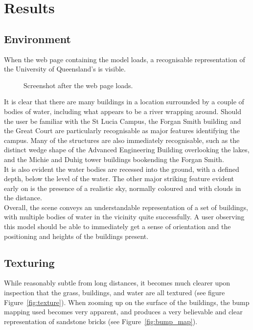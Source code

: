 \section{Results} %
\label{sec:results}
    \subsection{Environment} %
    \label{sub:environment}
        When the web page containing the model loads, a recognisable representation of the University of Queensland's is visible.

        \begin{figure}[H]
            \centering
            \caption{
                Screenshot after the web page loads.
            }
            \label{fig:start}
        \end{figure}

        It is clear that there are many buildings in a location surrounded by
        a couple of bodies of water, including what appears to be a river wrapping around.
        Should the user be familiar with the St Lucia Campus, the Forgan Smith building and the Great Court are particularly recognisable as major features identifying the campus.
        Many of the structures are also immediately recognisable, such as the distinct wedge shape of the Advanced Engineering Building overlooking the lakes, and the Michie and Duhig tower buildings bookending the Forgan Smith.\\

        It is also evident the water bodies are recessed into the ground, with a defined depth, below the level of the water.
        The other major striking feature evident early on is the presence of a realistic sky, normally coloured and with clouds in the distance.\\

        Overall, the scene conveys an understandable representation of a set of buildings, with multiple bodies of water in the vicinity quite successfully.
        A user observing this model should be able to immediately get a sense of orientation and the positioning and heights of the buildings present.

    \subsection{Texturing} %
    \label{sub:texturing}
        While reasonably subtle from long distances, it becomes much clearer upon inspection that the grass, buildings, and water are all textured (see figure Figure~\ref{fig:texture}).
        When zooming up on the surface of the buildings, the bump mapping used becomes very apparent, and produces a very believable and clear representation of sandstone bricks (see Figure~\ref{fig:bump_map}).

